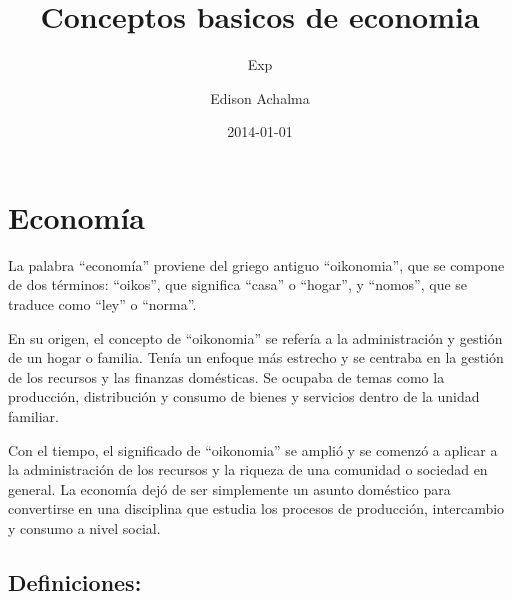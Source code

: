 \documentclass[
  a4paper,
]{article}
\title{Conceptos basicos de economia}
\subtitle{Exp}
\author{Edison Achalma}
\date{2014-01-01}
\begin{document}
\maketitle

\section{Economía}\label{economuxeda}

La palabra ``economía'' proviene del griego antiguo ``oikonomia'', que
se compone de dos términos: ``oikos'', que significa ``casa'' o
``hogar'', y ``nomos'', que se traduce como ``ley'' o ``norma''.

En su origen, el concepto de ``oikonomia'' se refería a la
administración y gestión de un hogar o familia. Tenía un enfoque más
estrecho y se centraba en la gestión de los recursos y las finanzas
domésticas. Se ocupaba de temas como la producción, distribución y
consumo de bienes y servicios dentro de la unidad familiar.

Con el tiempo, el significado de ``oikonomia'' se amplió y se comenzó a
aplicar a la administración de los recursos y la riqueza de una
comunidad o sociedad en general. La economía dejó de ser simplemente un
asunto doméstico para convertirse en una disciplina que estudia los
procesos de producción, intercambio y consumo a nivel social.

\subsection{Definiciones:}\label{definiciones}
\end{document}
